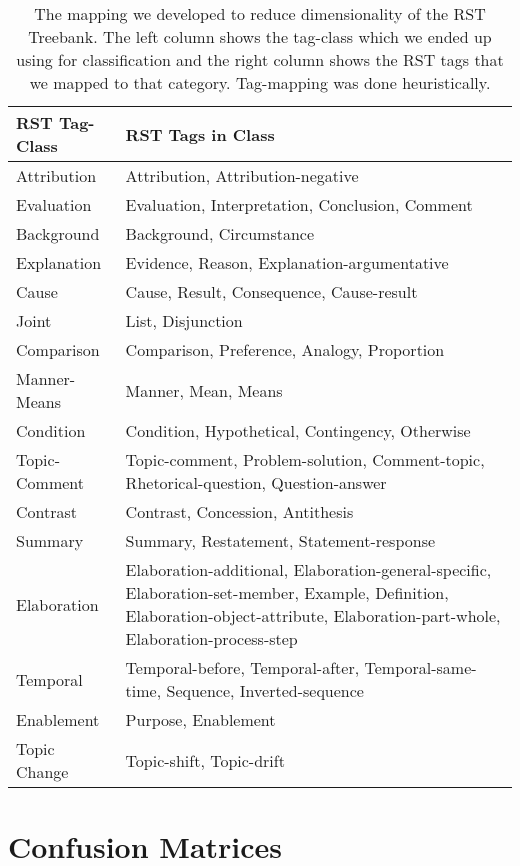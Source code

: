 \documentclass[11pt]{article}
\begin{document}
\begin{table*}[t]
    \centering
\begin{tabular}{|p{2cm}|p{13cm}|}
\hline
RST Tag-Class & RST Tags in Class \\
\hline
\hline
Attribution   & Attribution, Attribution-negative \\
\hline
Evaluation    & Evaluation, Interpretation, Conclusion, Comment \\
\hline
Background    & Background, Circumstance \\
\hline
Explanation   & Evidence, Reason, Explanation-argumentative \\
\hline
Cause         & Cause, Result, Consequence, Cause-result \\
\hline
Joint         & List, Disjunction \\
\hline
Comparison    & Comparison, Preference, Analogy, Proportion \\
\hline
Manner-Means  & Manner, Mean, Means \\
\hline
Condition     & Condition, Hypothetical, Contingency, Otherwise \\
\hline
Topic-Comment & Topic-comment, Problem-solution, Comment-topic, Rhetorical-question, Question-answer \\
\hline
Contrast      & Contrast, Concession, Antithesis \\
\hline
Summary       & Summary, Restatement, Statement-response \\
\hline
Elaboration   & Elaboration-additional, Elaboration-general-specific, Elaboration-set-member, Example, 
Definition, Elaboration-object-attribute, Elaboration-part-whole, Elaboration-process-step \\
\hline
Temporal      & Temporal-before, Temporal-after, Temporal-same-time, Sequence, Inverted-sequence \\
\hline
Enablement    & Purpose, Enablement \\
\hline
Topic Change  & Topic-shift, Topic-drift \\
\hline
\end{tabular}
    \caption{The mapping we developed to reduce dimensionality of the RST Treebank. The left column shows the tag-class which we ended up using for classification and the right column shows the RST tags that we mapped to that category. Tag-mapping was done heuristically.}
    \label{tab:RST_mapper}
\end{table*}



\section{Confusion Matrices}
\label{app:confusion_matrices}
\end{document}
